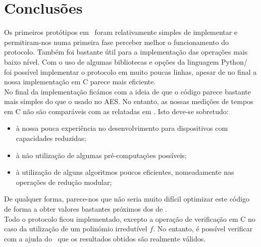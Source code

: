 \section{Conclusões}
Os primeiros protótipos em \sage\ foram relativamente simples de implementar e permitiram-nos numa primeira fase perceber melhor o funcionamento do protocolo. Também foi bastante útil para a implementação das operações mais baixo nível. Com o uso de algumas bibliotecas e opções da linguagem \textsf{Python}/\sage\, foi possível implementar o protocolo em muito poucas linhas, apesar de no final a nossa implementação em \textsf{C} parece mais eficiente.\\
No final da implementação ficámos com a ideia de que o código parece bastante mais simples do que o usado no \textsf{AES}. No entanto, as nossas medições de tempos em \textsf{C} não são comparáveis com as relatadas em \cite{lapin}. Isto deve-se sobretudo:
\begin{itemize}
  \item à nossa pouca experiência no desenvolvimento para dispositivos com capacidades reduzidas;
  \item à não utilização de algumas pré-computações possíveis;
  \item à utilização de alguns algoritmos poucos eficientes, nomeadamente nas operações de redução modular;
\end{itemize}
De qualquer forma, parece-nos que não seria muito difícil optimizar este código de forma a obter valores bastantes próximos dos de \cite{lapin}.\\
Todo o protocolo ficou implementado, excepto a operação de verificação em \textsf{C} no caso da utilização de um polinómio irredutível $f$. No entanto, é possível verificar com a ajuda do \sage\ que os resultados obtidos são realmente válidos.\\